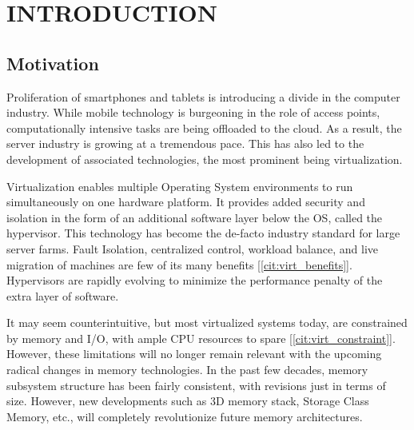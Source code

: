 %
%
%



\pagestyle{plain} %
\setcounter{page}{1}


\chapter{\uppercase {Introduction}}

\section{Motivation}
Proliferation of smartphones and tablets is introducing a divide in the computer industry. While mobile technology is burgeoning in the role of access points, computationally intensive tasks are being offloaded to the cloud. As a result, the server industry is growing at a tremendous pace. This has also led to the development of associated technologies, the most prominent being virtualization.

Virtualization enables multiple Operating System environments to run simultaneously on one hardware platform. It provides added security and isolation in the form of an additional software layer below the OS, called the hypervisor. This technology has become the de-facto industry standard for large server farms. Fault Isolation, centralized control, workload balance, and live migration of machines are few of its many benefits [\ref{cit:virt_benefits}]. Hypervisors are rapidly evolving to minimize the performance penalty of the extra layer of software.

It may seem counterintuitive, but most virtualized systems today, are constrained by memory and I/O, with ample CPU resources to spare [\ref{cit:virt_constraint}]. However, these limitations will no longer remain relevant with the upcoming radical changes in memory technologies. In the past few decades, memory subsystem structure has been fairly consistent, with revisions just in terms of size. However, new developments such as 3D memory stack, Storage Class Memory, etc., will completely revolutionize future memory architectures.

